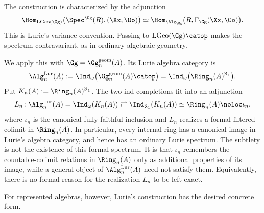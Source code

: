 	The construction is characterized by the adjunction
	\[
		\Hom_{\mathrm{LGeo}(\Gg)}\bigl(\Spec^{\Gg}(R),(\Xx,\Oo)\bigr)
		\simeq
		\Hom_{\Alg_{\Gg}}\bigl(R,\Gamma_{\Gg}(\Xx,\Oo)\bigr).
	\]
	This is Lurie's variance convention. Passing to $\mathrm{LGeo}(\Gg)\catop$ makes the spectrum contravariant, as in ordinary algebraic geometry.

	We apply this with $\Gg = \Gg_n^{\mathrm{geom}}(A)$. Its Lurie algebra category is
	\[
		\Alg_n^{\mathrm{Lur}}(A)
		:= \Ind_{\omega}\bigl(\Gg_n^{\mathrm{geom}}(A)\catop\bigr)
		= \Ind_{\omega}\bigl(\Ring_n(A)^{\aleph_1}\bigr).
	\]
	Put $K_n(A) := \Ring_n(A)^{\aleph_1}$. The two ind-completions fit into an adjunction
	\[
		L_n\colon
		\Alg_n^{\mathrm{Lur}}(A) = \Ind_{\omega}(K_n(A))
		\rightleftarrows
		\Ind_{\aleph_1}(K_n(A)) \simeq \Ring_n(A)
		\noloc \iota_n,
	\]
	where $\iota_n$ is the canonical fully faithful inclusion and $L_n$ realizes a formal filtered colimit in $\Ring_n(A)$. In particular, every internal ring has a canonical image in Lurie's algebra category, and hence has an ordinary Lurie spectrum. The subtlety is not the existence of this formal spectrum. It is that $\iota_n$ remembers the countable-colimit relations in $\Ring_n(A)$ only as additional properties of its image, while a general object of $\Alg_n^{\mathrm{Lur}}(A)$ need not satisfy them. Equivalently, there is no formal reason for the realization $L_n$ to be left exact.

	For represented algebras, however, Lurie's construction has the desired concrete form.

